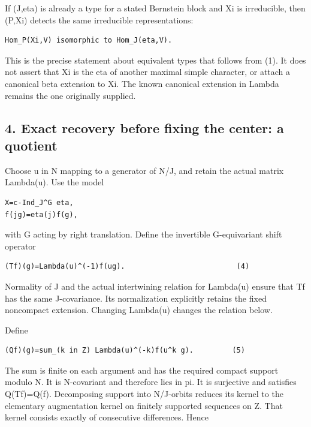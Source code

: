If (J,eta) is already a type for a stated Bernstein block and Xi is
irreducible, then (P,Xi) detects the same irreducible representations:

\begin{Verbatim}[fontsize=\small,breaklines=true,breakanywhere=true]
Hom_P(Xi,V) isomorphic to Hom_J(eta,V).
\end{Verbatim}

This is the precise statement about equivalent types that follows from (1). It
does not assert that Xi is the eta of another maximal simple character,
or attach a canonical beta extension to Xi. The known canonical
extension in Lambda remains the one originally supplied.

\hypertarget{lowrank_contract-exact-recovery-before-fixing-the-center-a-quotient}{%
\subsection{4. Exact recovery before fixing the center: a
quotient}\label{lowrank_contract-exact-recovery-before-fixing-the-center-a-quotient}}

Choose u in N mapping to a generator of N/J, and retain the actual
matrix Lambda(u). Use the model

\begin{Verbatim}[fontsize=\small,breaklines=true,breakanywhere=true]
X=c-Ind_J^G eta,
f(jg)=eta(j)f(g),
\end{Verbatim}

with G acting by right translation. Define the invertible G-equivariant
shift operator

\begin{Verbatim}[fontsize=\small,breaklines=true,breakanywhere=true]
(Tf)(g)=Lambda(u)^(-1)f(ug).                          (4)
\end{Verbatim}

Normality of J and the actual intertwining relation for Lambda(u) ensure
that Tf has the same J-covariance. Its normalization explicitly retains the fixed noncompact extension. Changing Lambda(u) changes the relation
below.

Define

\begin{Verbatim}[fontsize=\small,breaklines=true,breakanywhere=true]
(Qf)(g)=sum_(k in Z) Lambda(u)^(-k)f(u^k g).         (5)
\end{Verbatim}

The sum is finite on each argument and has the required compact support
modulo N. It is N-covariant and therefore lies in pi. It is surjective
and satisfies Q(Tf)=Q(f). Decomposing support into N/J-orbits reduces
its kernel to the elementary augmentation kernel on finitely supported
sequences on Z. That kernel consists exactly of consecutive differences.
Hence

